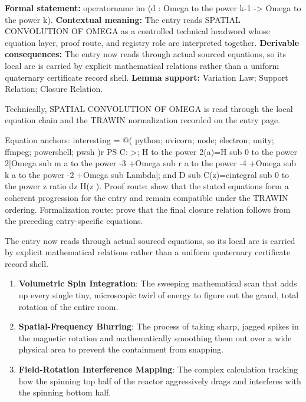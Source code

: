 \begingroup\footnotesize\setlength{\emergencystretch}{3em}\sloppy
\textbf{Formal statement:} operatorname im (d : Omega to the power k-1 -> Omega to the power k). \textbf{Contextual meaning:} The entry reads SPATIAL CONVOLUTION OF OMEGA as a controlled technical headword whose equation layer, proof route, and registry role are interpreted together. \textbf{Derivable consequences:} The entry now reads through actual sourced equations, so its local arc is carried by explicit mathematical relations rather than a uniform quaternary certificate record shell. \textbf{Lemma support:} Variation Law; Support Relation; Closure Relation.\par
\endgroup

Technically, SPATIAL CONVOLUTION OF OMEGA is read through the local equation chain and the TRAWIN normalization recorded on the entry page.

Equation anchors: interesting = @( python; uvicorn; node; electron; unity; ffmpeg; powershell; pwsh )r PS C: >; H to the power 2(a)=H sub 0 to the power 2[Omega sub m a to the power -3 +Omega sub r a to the power -4 +Omega sub k a to the power -2 +Omega sub Lambda]; and D sub C(z)=cintegral sub 0 to the power z ratio dz H(z ). Proof route: show that the stated equations form a coherent progression for the entry and remain compatible under the TRAWIN ordering. Formalization route: prove that the final closure relation follows from the preceding entry-specific equations.

The entry now reads through actual sourced equations, so its local arc is carried by explicit mathematical relations rather than a uniform quaternary certificate record shell.
\endgroup

\begin{enumerate}[leftmargin=1.6em,itemsep=6pt,topsep=4pt]
\item \textbf{Volumetric Spin Integration}: The sweeping mathematical scan that adds up every single tiny, microscopic twirl of energy to figure out the grand, total rotation of the entire room.
\item \textbf{Spatial-Frequency Blurring}: The process of taking sharp, jagged spikes in the magnetic rotation and mathematically smoothing them out over a wide physical area to prevent the containment from snapping.
\item \textbf{Field-Rotation Interference Mapping}: The complex calculation tracking how the spinning top half of the reactor aggressively drags and interferes with the spinning bottom half.
\end{enumerate}

